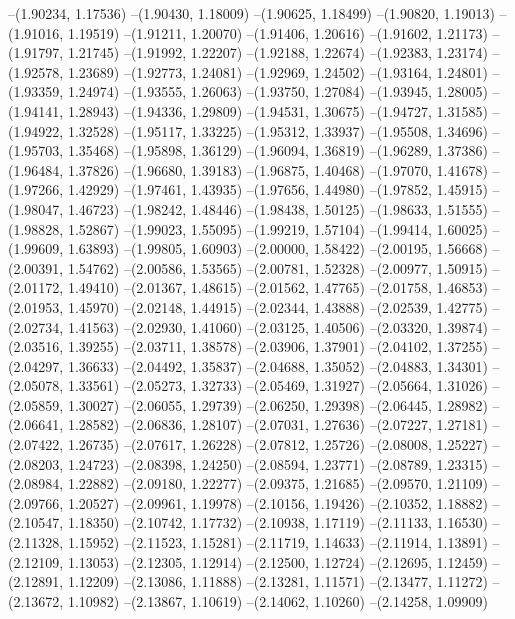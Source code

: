 --(1.90234, 1.17536)
--(1.90430, 1.18009)
--(1.90625, 1.18499)
--(1.90820, 1.19013)
--(1.91016, 1.19519)
--(1.91211, 1.20070)
--(1.91406, 1.20616)
--(1.91602, 1.21173)
--(1.91797, 1.21745)
--(1.91992, 1.22207)
--(1.92188, 1.22674)
--(1.92383, 1.23174)
--(1.92578, 1.23689)
--(1.92773, 1.24081)
--(1.92969, 1.24502)
--(1.93164, 1.24801)
--(1.93359, 1.24974)
--(1.93555, 1.26063)
--(1.93750, 1.27084)
--(1.93945, 1.28005)
--(1.94141, 1.28943)
--(1.94336, 1.29809)
--(1.94531, 1.30675)
--(1.94727, 1.31585)
--(1.94922, 1.32528)
--(1.95117, 1.33225)
--(1.95312, 1.33937)
--(1.95508, 1.34696)
--(1.95703, 1.35468)
--(1.95898, 1.36129)
--(1.96094, 1.36819)
--(1.96289, 1.37386)
--(1.96484, 1.37826)
--(1.96680, 1.39183)
--(1.96875, 1.40468)
--(1.97070, 1.41678)
--(1.97266, 1.42929)
--(1.97461, 1.43935)
--(1.97656, 1.44980)
--(1.97852, 1.45915)
--(1.98047, 1.46723)
--(1.98242, 1.48446)
--(1.98438, 1.50125)
--(1.98633, 1.51555)
--(1.98828, 1.52867)
--(1.99023, 1.55095)
--(1.99219, 1.57104)
--(1.99414, 1.60025)
--(1.99609, 1.63893)
--(1.99805, 1.60903)
--(2.00000, 1.58422)
--(2.00195, 1.56668)
--(2.00391, 1.54762)
--(2.00586, 1.53565)
--(2.00781, 1.52328)
--(2.00977, 1.50915)
--(2.01172, 1.49410)
--(2.01367, 1.48615)
--(2.01562, 1.47765)
--(2.01758, 1.46853)
--(2.01953, 1.45970)
--(2.02148, 1.44915)
--(2.02344, 1.43888)
--(2.02539, 1.42775)
--(2.02734, 1.41563)
--(2.02930, 1.41060)
--(2.03125, 1.40506)
--(2.03320, 1.39874)
--(2.03516, 1.39255)
--(2.03711, 1.38578)
--(2.03906, 1.37901)
--(2.04102, 1.37255)
--(2.04297, 1.36633)
--(2.04492, 1.35837)
--(2.04688, 1.35052)
--(2.04883, 1.34301)
--(2.05078, 1.33561)
--(2.05273, 1.32733)
--(2.05469, 1.31927)
--(2.05664, 1.31026)
--(2.05859, 1.30027)
--(2.06055, 1.29739)
--(2.06250, 1.29398)
--(2.06445, 1.28982)
--(2.06641, 1.28582)
--(2.06836, 1.28107)
--(2.07031, 1.27636)
--(2.07227, 1.27181)
--(2.07422, 1.26735)
--(2.07617, 1.26228)
--(2.07812, 1.25726)
--(2.08008, 1.25227)
--(2.08203, 1.24723)
--(2.08398, 1.24250)
--(2.08594, 1.23771)
--(2.08789, 1.23315)
--(2.08984, 1.22882)
--(2.09180, 1.22277)
--(2.09375, 1.21685)
--(2.09570, 1.21109)
--(2.09766, 1.20527)
--(2.09961, 1.19978)
--(2.10156, 1.19426)
--(2.10352, 1.18882)
--(2.10547, 1.18350)
--(2.10742, 1.17732)
--(2.10938, 1.17119)
--(2.11133, 1.16530)
--(2.11328, 1.15952)
--(2.11523, 1.15281)
--(2.11719, 1.14633)
--(2.11914, 1.13891)
--(2.12109, 1.13053)
--(2.12305, 1.12914)
--(2.12500, 1.12724)
--(2.12695, 1.12459)
--(2.12891, 1.12209)
--(2.13086, 1.11888)
--(2.13281, 1.11571)
--(2.13477, 1.11272)
--(2.13672, 1.10982)
--(2.13867, 1.10619)
--(2.14062, 1.10260)
--(2.14258, 1.09909)
